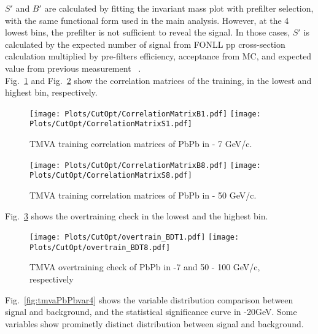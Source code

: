 $S'$ and $B'$ are calculated by fitting the invariant mass plot with prefilter selection, with the same functional form used in the main analysis. However, at the 4 lowest \pt bins, the prefilter is not sufficient to reveal the signal. In those cases, $S'$ is calculated by the expected number of signal from FONLL pp cross-section calculation multiplied by pre-filters efficiency, acceptance from MC, and expected \raa value from previous measurement ~\cite{CMS-PAS-HIN-16-011}. \\
Fig.~\ref{fig:tmvaPbPbCorr1} and Fig.~\ref{fig:tmvaPbPbCorr8} show the correlation matrices of the training, in the lowest and highest \pt bin, respectively.

\begin{figure}[h]
\begin{center}
\texttt{[image: Plots/CutOpt/CorrelationMatrixB1.pdf]}
\texttt{[image: Plots/CutOpt/CorrelationMatrixS1.pdf]}
\caption{TMVA training correlation matrices of PbPb in  - 7 GeV/c.}
\label{fig:tmvaPbPbCorr1}
\end{center}
\end{figure}

\begin{figure}[h]
\begin{center}
\texttt{[image: Plots/CutOpt/CorrelationMatrixB8.pdf]}
\texttt{[image: Plots/CutOpt/CorrelationMatrixS8.pdf]}
\caption{TMVA training correlation matrices of PbPb in  - 50 GeV/c.}
\label{fig:tmvaPbPbCorr8}
\end{center}
\end{figure}

\clearpage
Fig.~\ref{fig:tmvaPbPbOvertrain18} shows the overtraining check in the lowest and the highest \pt bin. \\

\begin{figure}[h]
\begin{center}
\texttt{[image: Plots/CutOpt/overtrain\_BDT1.pdf]}
\texttt{[image: Plots/CutOpt/overtrain\_BDT8.pdf]}
\caption{TMVA overtraining check of PbPb in -7 and 50 - 100 GeV/c, respectively}
\label{fig:tmvaPbPbOvertrain18}
\end{center}
\end{figure}

Fig.~\ref{fig:tmvaPbPbvar4} shows the variable distribution comparison between signal and background, and the statistical significance curve in -20GeV. Some variables show prominetly distinct distribution between signal and background. \\

